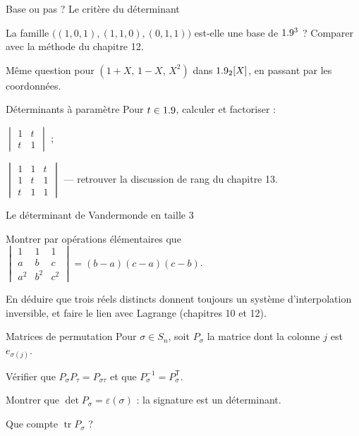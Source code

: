 \begin{exercice}[2]{Base ou pas ? Le critère du déterminant}
\begin{questions}
  \item La famille $\bigl((1,0,1),(1,1,0),(0,1,1)\bigr)$ est-elle une base
    de $1.9^{3}$ ? Comparer avec la méthode du chapitre 12.
  \item Même question pour $(1+X,\,1-X,\,X^{2})$ dans $1.9_2[X]$, en
    passant par les coordonnées.
\end{questions}
\end{exercice}

\begin{exercice}[2]{Déterminants à paramètre}
Pour $t\in1.9$, calculer et factoriser :
\begin{questions}
  \item $\begin{vmatrix}1&t\\t&1\end{vmatrix}$ ;
  \item $\begin{vmatrix}1&1&t\\1&t&1\\t&1&1\end{vmatrix}$ — retrouver la
    discussion de rang du chapitre 13.
\end{questions}
\end{exercice}

\begin{exercice}[2]{Le déterminant de Vandermonde en taille 3}
\begin{questions}
  \item Montrer par opérations élémentaires que
    $\begin{vmatrix}1&1&1\\a&b&c\\a^{2}&b^{2}&c^{2}\end{vmatrix}
    =(b-a)(c-a)(c-b)$.
  \item En déduire que trois réels distincts donnent toujours un système
    d'interpolation inversible, et faire le lien avec Lagrange
    (chapitres 10 et 12).
\end{questions}
\end{exercice}

\begin{exercice}[2]{Matrices de permutation}
Pour $\sigma\in S_n$, soit $P_\sigma$ la matrice dont la colonne $j$ est
$e_{\sigma(j)}$.
\begin{questions}
  \item Vérifier que $P_\sigma P_\tau=P_{\sigma\tau}$ et que
    $P_\sigma^{-1}=P_\sigma^{\mathsf T}$.
  \item Montrer que $\det P_\sigma=\varepsilon(\sigma)$ : la signature
    est un déterminant.
  \item Que compte $\operatorname{tr}P_\sigma$ ?
\end{questions}
\end{exercice}


